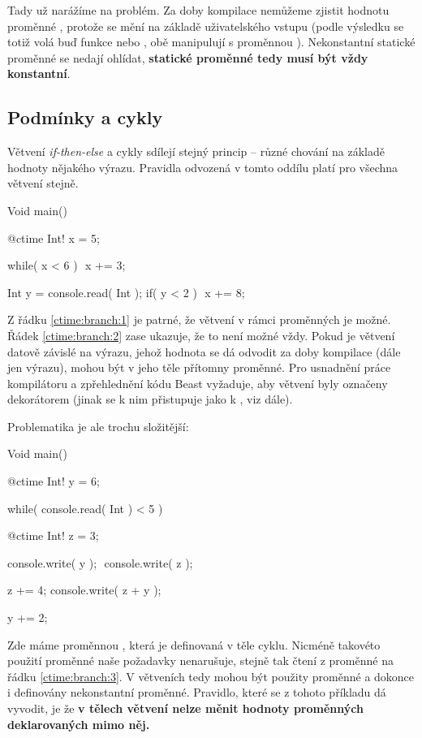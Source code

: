 Tady už narážíme na problém. Za doby kompilace nemůžeme zjistit hodnotu proměnné , protože se mění na základě uživatelského vstupu (podle výsledku  se totiž volá buď funkce  nebo , obě manipulují s proměnnou ). Nekonstantní statické proměnné se nedají ohlídat, \textbf{\ctime statické proměnné tedy musí být vždy konstantní}.

\subsection{Podmínky a cykly}
Větvení \textit{if-then-else} a cykly sdílejí stejný princip -- různé chování na základě hodnoty nějakého výrazu. Pravidla odvozená v tomto oddílu platí pro všechna větvení stejně.

\begin{code}
Void main() {
	@ctime Int! x = 5;
	
	while( x < 6 ) $\label{ctime:branch:1}$
		x += 3;

	Int y = console.read( Int );
	if( y < 2 ) $\label{ctime:branch:2}$
		x += 8;
}
\end{code}

Z řádku \ref{ctime:branch:1} je patrné, že větvení v rámci \ctime proměnných je možné. Řádek \ref{ctime:branch:2} zase ukazuje, že to není možné vždy. Pokud je větvení datově závislé na výrazu, jehož hodnota se dá odvodit za doby kompilace (dále jen \ctime výrazu), mohou být v jeho těle přítomny \ctime proměnné. Pro usnadnění práce kompilátoru a zpřehlednění kódu Beast vyžaduje, aby \ctime větvení byly označeny dekorátorem (jinak se k nim přistupuje jako k \nonctime, viz dále).

Problematika je ale trochu složitější:

\begin{code}
Void main() {
	@ctime Int! y = 6;

	while( console.read( Int ) < 5 ) {
		@ctime Int! z = 3;
				
		console.write( y );	$\label{ctime:branch:3}$
		console.write( z );
		
		z += 4;
		console.write( z + y );
		
		y += 2;
	}
}
\end{code}

Zde máme proměnnou , která je definovaná v těle \nonctime cyklu. Nicméně takovéto použití proměnné naše požadavky nenarušuje, stejně tak čtení z proměnné  na řádku \ref{ctime:branch:3}. V \nonctime větveních tedy mohou být použity \ctime proměnné a dokonce i definovány nekonstantní \ctime proměnné. Pravidlo, které se z tohoto příkladu dá vyvodit, je že \textbf{v tělech \nonctime větvení nelze měnit hodnoty \ctime proměnných deklarovaných mimo něj.}

